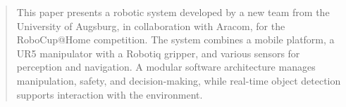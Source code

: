 \begin{abstract}
  This paper presents a robotic system developed by a new team from the University of Augsburg, in collaboration with Aracom, for the RoboCup@Home competition. The system combines a mobile platform, a UR5 manipulator with a Robotiq gripper, and various sensors for perception and navigation. A modular software architecture manages manipulation, safety, and decision-making, while real-time object detection supports interaction with the environment.
\end{abstract}
